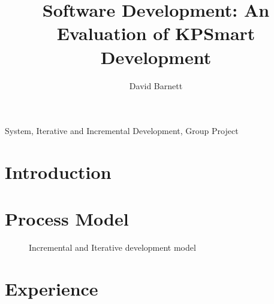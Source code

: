 \documentclass{style/CRPITStyle}
\begin{document}
\title{Software Development: An Evaluation of KPSmart Development}
\author{David Barnett}

\maketitle

\begin{abstract}
\end{abstract}

\vspace{.1in}

\/ System, Iterative and Incremental Development, Group Project

\vspace{.1in}

\section{Introduction}

\section{Process Model}

\begin{figure}[htb]
\caption{\protect\label{s-system} Incremental and Iterative development model }
\end{figure}

\section{Experience}
\end{document}
